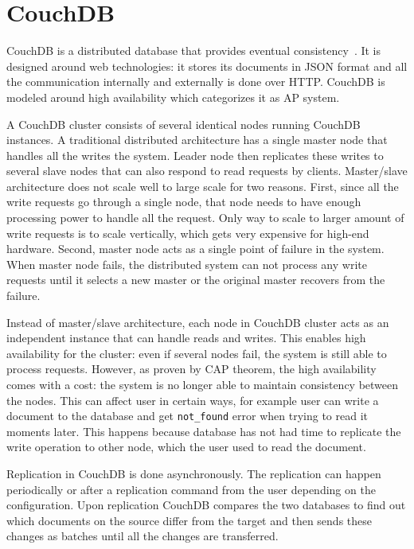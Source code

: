 \section{CouchDB}

CouchDB is a distributed database that provides eventual
consistency~\cite{anderson2010couchdb}. It is designed around web technologies:
it stores its documents in JSON format and all the communication internally and
externally is done over HTTP\@. CouchDB is modeled around high availability
which categorizes it as AP system.

A CouchDB cluster consists of several identical nodes running CouchDB instances.
A traditional distributed architecture has a single master node that handles all
the writes the system. Leader node then replicates these writes to several
slave nodes that can also respond to read requests by clients. Master/slave
architecture does not scale well to large scale for two reasons. First, since
all the write requests go through a single node, that node needs to have enough
processing power to handle all the request. Only way to scale to larger amount
of write requests is to scale vertically, which gets very expensive for high-end
hardware. Second, master node acts as a single point of failure in the system.
When master node fails, the distributed system can not process any write
requests until it selects a new master or the original master recovers from the
failure.

Instead of master/slave architecture, each node in CouchDB cluster acts as an
independent instance that can handle reads and writes. This enables high
availability for the cluster: even if several nodes fail, the system is still
able to process requests. However, as proven by CAP theorem, the high
availability comes with a cost: the system is no longer able to maintain
consistency between the nodes. This can affect user in certain ways, for example
user can write a document to the database and get \texttt{not\_found} error when
trying to read it moments later. This happens because database has not had time
to replicate the write operation to other node, which the user used to read the
document.

Replication in CouchDB is done asynchronously. The replication can happen
periodically or after a replication command from the user depending on the
configuration. Upon replication CouchDB compares the two databases to find out
which documents on the source differ from the target and then sends these
changes as batches until all the changes are transferred.

